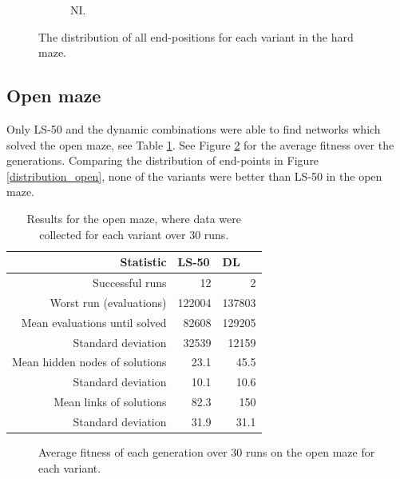 \begin{figure}[H]
\begin{mdframed}
\begin{subfigure}[t]{0.5\textwidth}
            \caption{NI.}
        \end{subfigure}
    \end{mdframed}
    \caption{The distribution of all end-positions for each variant in the hard maze.}
    \label{distribution}
\end{figure}

\subsection{Open maze}
Only LS-50 and the dynamic combinations were able to find networks which solved the open maze, see Table \ref{open}.
See Figure \ref{open_fitness} for the average fitness over the generations. Comparing the distribution of end-points in Figure \ref{distribution_open},
none of the variants were better than LS-50 in the open maze.
\begin{table}[H]
    \centering
    \begin{tabular}{rrr}
    \toprule
    Statistic & \multicolumn{1}{l}{LS-50} & \multicolumn{1}{l}{DL} \\
    \midrule
    Successful runs & 12 & 2 \\
    Worst run (evaluations) & 122004 & 137803 \\
    \rowcolor[gray]{.9} Mean evaluations until solved & 82608 & 129205 \\
    Standard deviation & 32539  & 12159 \\
    \rowcolor[gray]{.9} Mean hidden nodes of solutions & 23.1 & 45.5 \\
    Standard deviation & 10.1 & 10.6 \\
    \rowcolor[gray]{.9} Mean links of solutions & 82.3  & 150 \\
    Standard deviation & 31.9  & 31.1 \\
    \bottomrule
    \end{tabular}
    \caption{Results for the open maze, where data were collected for each variant over 30 runs.}
    \label{open}
\end{table}

\begin{figure}[H]
    \begin{center}
        
    \end{center}
    \caption{Average fitness of each generation over 30 runs on the open maze for each variant.}
    \label{open_fitness}
\end{figure}

